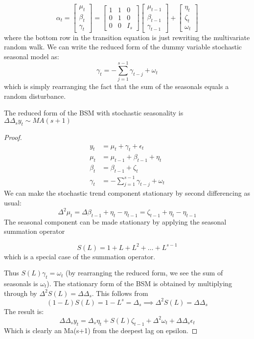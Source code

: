 \documentclass[DIV=14,titlepage=false]{scrreprt}
\begin{document}
\[
    \alpha_t = \begin{bmatrix} \mu_t \\ \beta_t \\ \gamma_t \end{bmatrix} = \begin{bmatrix} 1 & 1 & 0 \\ 0 & 1 & 0 \\ 0 & 0 & I_s \end{bmatrix} \begin{bmatrix} \mu_{t-1} \\ \beta_{t-1} \\ \gamma_{t-1} \end{bmatrix} + \begin{bmatrix} \eta_t \\ \zeta_t \\ \omega_t \end{bmatrix}
\]
where the bottom row in the transition equation is just rewriting the multivariate random walk. We can write the reduced form of the dummy variable stochastic seasonal model as:
\[
    \gamma_t = - \sum_{j=1}^{s-1} \gamma_{t-j} + \omega_t
\]
which is simply rearranging the fact that the sum of the seasonals equals a random disturbance.
\begin{claim}
    The reduced form of the BSM with stochastic seasonality is $\Delta \Delta_s y_t \sim MA(s+1)$
\end{claim}
\begin{proof}
    \begin{align*}
        y_t &= \mu_t + \gamma_t + \epsilon_t\\
        \mu_t &= \mu_{t-1} + \beta_{t-1} + \eta_t\\
        \beta_t &= \beta_{t-1} + \zeta_t\\
        \gamma_t &= - \sum_{j=1}^{s-1} \gamma_{t-j} + \omega_t
    \end{align*}
    We can make the stochastic trend component stationary by second differencing as usual:
    \[
        \Delta^2 \mu_t = \Delta \beta_{t-1} + \eta_t - \eta_{t-1} = \zeta_{t-1} + \eta_t - \eta_{t-1}
    \]
    The seasonal component can be made stationary by applying the seasonal summation operator
    \begin{definition}
        \[
            S(L) = 1 + L + L^2 + \ldots + L^{s-1}
        \]
        which is a special case of the summation operator.
    \end{definition}
    Thus $S(L)\gamma_t = \omega_t$ (by rearranging the reduced form, we see the sum of seasonals is $\omega_t$). The stationary form of the BSM is obtained by multiplying through by $\Delta^2 S(L) = \Delta \Delta_s$. This follows from 
    \[
        (1-L)S(L) = 1 - L^s = \Delta_s \implies \Delta^2 S(L) = \Delta \Delta_s
    \]
    The result is:
    \[
        \Delta \Delta_s y_t = \Delta_s \eta_t + S(L) \zeta_{t-1} + \Delta^2 \omega_t + \Delta \Delta_s \epsilon_t
    \]
    Which is clearly an Ma(s+1) from the deepest lag on epsilon.
\end{proof}
\end{document}

